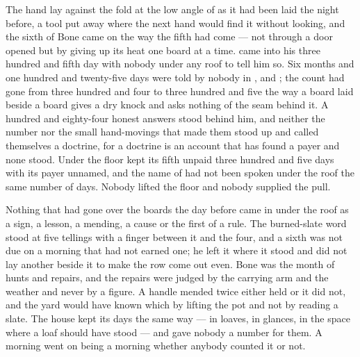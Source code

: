 
The hand lay against the fold at the low angle of  as it had been laid the night before, a tool put away where the next hand would find it without looking, and the sixth of Bone came on the way the fifth had come --- not through a door opened but by  giving up its heat one board at a time.  came into his three hundred and fifth day with nobody under any roof to tell him so. Six months and one hundred and twenty-five days were told by nobody in ,  and ; the count had gone from three hundred and four to three hundred and five the way a board laid beside a board gives a dry knock and asks nothing of the seam behind it. A hundred and eighty-four honest answers stood behind him, and neither the number nor the small hand-movings that made them stood up and called themselves a doctrine, for a doctrine is an account that has found a payer and none stood. Under the floor  kept its fifth unpaid three hundred and five days with its payer unnamed, and the name of  had not been spoken under the roof the same number of days. Nobody lifted the floor and nobody supplied the pull.

Nothing that had gone over the boards the day before came in under the roof as a sign, a lesson, a mending, a cause or the first of a rule. The burned-slate word stood at five tellings with a finger between it and the four, and a sixth was not due on a morning that had not earned one; he left it where it stood and did not lay another beside it to make the row come out even. Bone was the month of hunts and repairs, and the repairs were judged by the carrying arm and the weather and never by a figure. A handle mended twice either held or it did not, and the yard would have known which by lifting the pot and not by reading a slate. The house kept its days the same way --- in loaves, in glances, in the space where a loaf should have stood --- and gave nobody a number for them. A morning went on being a morning whether anybody counted it or not.

